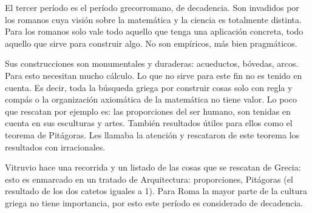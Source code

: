 El tercer período es el período grecorromano, de decadencia. Son invadidos por los romanos cuya visión sobre la matemática y la ciencia es totalmente distinta. Para los romanos solo vale todo aquello que tenga una aplicación concreta, todo aquello que sirve para construir algo. No son empíricos, más bien pragmáticos. 

Sus construcciones son monumentales y duraderas: acueductos, bóvedas, arcos. Para esto necesitan mucho cálculo. Lo que no sirve para este fin no es tenido en cuenta. Es decir, toda la búsqueda griega por construir cosas solo con regla y compás o la organización axiomática de la matemática no tiene valor. Lo poco que rescatan por ejemplo es: las proporciones del ser humano, son tenidas en cuenta en sus esculturas y artes. También resultados útiles para ellos como el teorema de Pitágoras. Les llamaba la atención y rescataron de este teorema los resultados con irracionales.

Vitruvio hace una recorrida y un listado de las cosas que se rescatan de Grecia: esto es enmarcado en un tratado de Arquitectura: proporciones, Pitágoras (el resultado de los dos catetos iguales a 1). Para Roma la mayor parte de la cultura griega no tiene importancia, por esto este período es considerado de decadencia.
